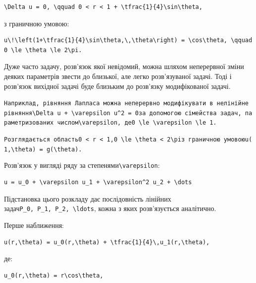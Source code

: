 \documentclass[
  ukrainian,
]{article}
\begin{document}
\begin{verbatim}
\Delta u = 0, \qquad 0 < r < 1 + \tfrac{1}{4}\sin\theta,
\end{verbatim}

з граничною умовою:

\begin{verbatim}
u\!\left(1+\tfrac{1}{4}\sin\theta,\,\theta\right) = \cos\theta, \qquad 0 \le \theta \le 2\pi.
\end{verbatim}

Дуже часто задачу, розв'язок якої невідомий, можна шляхом неперервної
зміни деяких параметрів звести до близької, але легко розв'язуваної
задачі. Тоді і розв'язок вихідної задачі буде близьким до розв'язку
модифікованої задачі.

\texttt{Наприклад,\ рівняння\ Лапласа\ можна\ неперервно\ модифікувати\ в\ нелінійне\ рівняння\textquotesingle{}\textbackslash{}Delta\ u\ +\ \textbackslash{}varepsilon\ u\^{}2\ =\ 0\textquotesingle{}за\ допомогою\ сімейства\ задач,\ параметризованих\ числом\textquotesingle{}\textbackslash{}varepsilon\textquotesingle{},\ де\textquotesingle{}0\ \textbackslash{}le\ \textbackslash{}varepsilon\ \textbackslash{}le\ 1\textquotesingle{}.}

\texttt{Розглядається\ область\textquotesingle{}0\ \textless{}\ r\ \textless{}\ 1\textquotesingle{},\textquotesingle{}0\ \textbackslash{}le\ \textbackslash{}theta\ \textless{}\ 2\textbackslash{}pi\textquotesingle{}з\ граничною\ умовою\textquotesingle{}u(1,\textbackslash{}theta)\ =\ g(\textbackslash{}theta)\textquotesingle{}.}

Розв'язок у вигляді ряду за
степенями\texttt{\textbackslash{}varepsilon}:

\begin{verbatim}
u = u_0 + \varepsilon u_1 + \varepsilon^2 u_2 + \dots
\end{verbatim}

Підстановка цього розкладу дає послідовність лінійних
задач\texttt{P\_0,\ P\_1,\ P\_2,\ \textbackslash{}ldots}, кожна з яких
розв'язується аналітично.

Перше наближення:

\begin{verbatim}
u(r,\theta) = u_0(r,\theta) + \tfrac{1}{4}\,u_1(r,\theta),
\end{verbatim}

де:

\begin{verbatim}
u_0(r,\theta) = r\cos\theta,
\end{verbatim}
\end{document}
